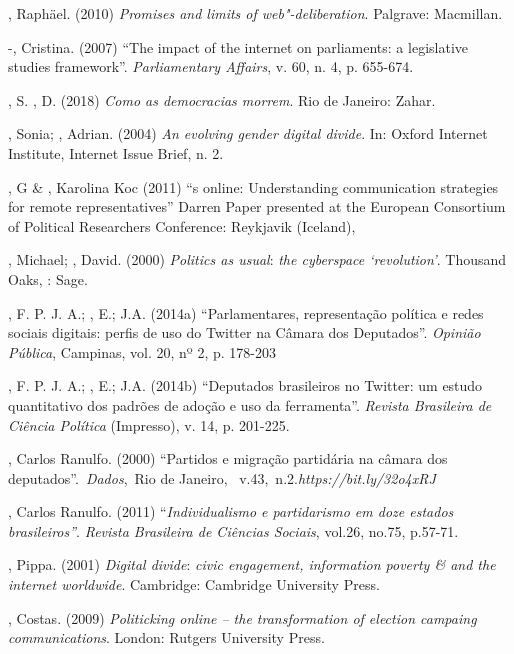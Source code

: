 \begin{Parskip}
, Raphäel. (2010) \emph{Promises and limits of web"-deliberation}.
Palgrave: Macmillan.

-, Cristina. (2007) ``The impact of the internet on
parliaments: a legislative studies framework''. \emph{Parliamentary
Affairs}, v. 60, n. 4, p. 655-674.

, S. , D. (2018) \emph{Como as democracias morrem}. Rio
de Janeiro: Zahar.

, Sonia; , Adrian. (2004) \emph{An evolving gender digital
divide}. In: Oxford Internet Institute, Internet Issue Brief, n. 2.

, G \& , Karolina Koc (2011) ``s online:
Understanding communication strategies for remote representatives''
Darren Paper presented at the European Consortium of Political
Researchers Conference: Reykjavik (Iceland),

, Michael; , David. (2000) \emph{Politics as usual}:
\emph{the cyberspace `revolution'}. Thousand Oaks, : Sage.

, F. P. J. A.; , E.;  J.A. (2014a) ``Parlamentares,
representação política e redes sociais digitais: perfis de uso do
Twitter na Câmara dos Deputados''. \emph{Opinião Pública}, Campinas,
vol. 20, nº 2, p. 178-203

, F. P. J. A.; , E.;  J.A. (2014b) ``Deputados
brasileiros no Twitter: um estudo quantitativo dos padrões de adoção e
uso da ferramenta''. \emph{Revista Brasileira de Ciência Política}
(Impresso), v. 14, p. 201-225.

, Carlos Ranulfo. (2000) ``Partidos e migração partidária na câmara
dos deputados''.~\emph{Dados},~Rio de Janeiro,~
v.43,~n.2.\emph{https://bit.ly/32o4xRJ}

, Carlos Ranulfo. (2011) ``\emph{Individualismo e partidarismo em
doze estados brasileiros''}. \emph{Revista Brasileira de Ciências
Sociais}, vol.26, no.75, p.57-71.

, Pippa. (2001) \emph{Digital divide}: \emph{civic engagement,
information poverty \& and the internet worldwide}. Cambridge: Cambridge
University Press.

, Costas. (2009) \emph{Politicking online -- the
transformation of election campaing communications}. London: Rutgers
University Press.


\end{Parskip}
